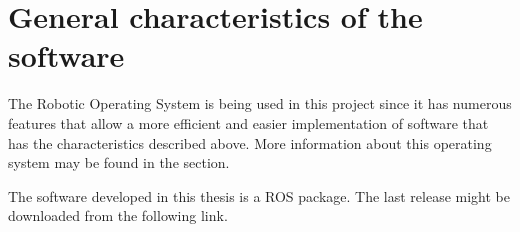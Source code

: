 \section*{General characteristics of the software}

The Robotic Operating System is being used in this project since it has numerous features that allow a more efficient and 
easier implementation of software that has the characteristics described above. More information about this operating 
system may be found in the section.

The software developed in this thesis is a ROS package. The last release might be downloaded from the following link. 

